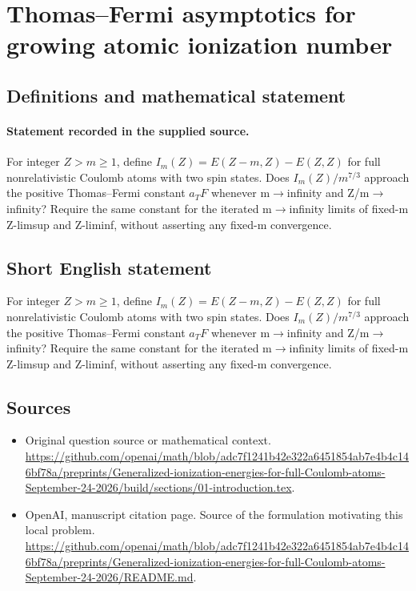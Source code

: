 \documentclass[11pt]{article}
\begin{document}
\section*{Thomas–Fermi asymptotics for growing atomic ionization number}\label{30007225}
\subsection{Definitions and mathematical statement}
\paragraph{Statement recorded in the supplied source.}
For integer $Z>m\geq 1$, define $I_m(Z)=E(Z-m,Z)-E(Z,Z)$ for full nonrelativistic Coulomb atoms with two spin states. Does $I_m(Z)/m^{7/3}$ approach the positive Thomas–Fermi constant $a_TF$ whenever m$\to$infinity and Z/m$\to$infinity? Require the same constant for the iterated m$\to$infinity limits of fixed-m Z-limsup and Z-liminf, without asserting any fixed-m convergence.
\subsection{Short English statement}
For integer $Z>m\geq 1$, define $I_m(Z)=E(Z-m,Z)-E(Z,Z)$ for full nonrelativistic Coulomb atoms with two spin states. Does $I_m(Z)/m^{7/3}$ approach the positive Thomas–Fermi constant $a_TF$ whenever m$\to$infinity and Z/m$\to$infinity? Require the same constant for the iterated m$\to$infinity limits of fixed-m Z-limsup and Z-liminf, without asserting any fixed-m convergence.
\subsection{Sources}
\begin{itemize}
\item[S1] Original question source or mathematical context.
\url{https://github.com/openai/math/blob/adc7f1241b42e322a6451854ab7e4b4c146bf78a/preprints/Generalized-ionization-energies-for-full-Coulomb-atoms-September-24-2026/build/sections/01-introduction.tex}.
\item[S2] OpenAI, manuscript citation page. Source of the formulation motivating this local problem.
\url{https://github.com/openai/math/blob/adc7f1241b42e322a6451854ab7e4b4c146bf78a/preprints/Generalized-ionization-energies-for-full-Coulomb-atoms-September-24-2026/README.md}.
\end{itemize}
\end{document}
